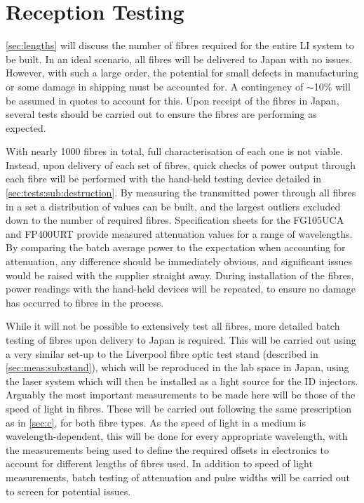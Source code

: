 \documentclass[a4paper,11pt]{article}
\let\oldsim\sim
\renewcommand{\sim}{{\oldsim}}
\begin{document}
\section{Reception Testing}\label{sec:testing}
\cref{sec:lengths} will discuss the number of fibres required for the entire LI system to be built. In an ideal scenario, all fibres will be delivered to Japan with no issues. However, with such a large order, the potential for small defects in manufacturing or some damage in shipping must be accounted for. A contingency of $\sim$10\% will be assumed in quotes to account for this. Upon receipt of the fibres in Japan, several tests should be carried out to ensure the fibres are performing as expected.

With nearly 1000 fibres in total, full characterisation of each one is not viable. Instead, upon delivery of each set of fibres, quick checks of power output through each fibre will be performed with the hand-held testing device detailed in \cref{sec:tests:sub:destruction}. By measuring the transmitted power through all fibres in a set a distribution of values can be built, and the largest outliers excluded down to the number of required fibres. Specification sheets for the FG105UCA \cite{bib:fg105uca} and FP400URT \cite{bib:fp400urt} provide measured attenuation values for a range of wavelengths. By comparing the batch average power to the expectation when accounting for attenuation, any difference should be immediately obvious, and significant issues would be raised with the supplier straight away. During installation of the fibres, power readings with the hand-held devices will be repeated, to ensure no damage has occurred to fibres in the process.

While it will not be possible to extensively test all fibres, more detailed batch testing of fibres upon delivery to Japan is required. This will be carried out using a very similar set-up to the Liverpool fibre optic test stand (described in \cref{sec:meas:sub:stand}), which will be reproduced in the lab space in Japan, using the laser system which will then be installed as a light source for the ID injectors. Arguably the most important measurements to be made here will be those of the speed of light in fibres. These will be carried out following the same prescription as in \cref{sec:c}, for both fibre types. As the speed of light in a medium is wavelength-dependent, this will be done for every appropriate wavelength, with the measurements being used to define the required offsets in electronics to account for different lengths of fibres used. In addition to speed of light measurements, batch testing of attenuation and pulse widths will be carried out to screen for potential issues.
\end{document}
